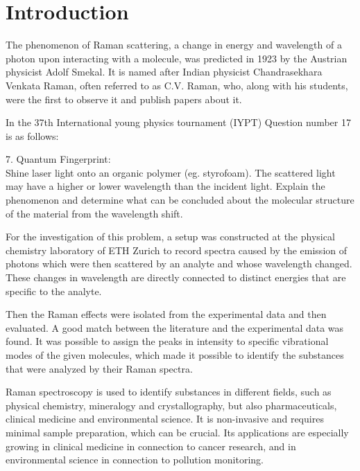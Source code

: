 \section{Introduction}


The phenomenon of Raman scattering, a change in energy and wavelength of a photon upon interacting with a molecule, was predicted in 1923 by the Austrian physicist Adolf Smekal. It is named after  Indian physicist Chandrasekhara Venkata Raman, often referred to as C.V. Raman, who, along with his students, were the first to observe it and publish papers about it.
\bigskip

In the 37th International young physics tournament (IYPT) Question number 17 is as follows:

\bigskip

7. Quantum Fingerprint:\\
 Shine laser light onto an organic polymer (eg. styrofoam). The scattered light may have a higher or lower wavelength than the incident light. Explain the phenomenon and determine what can be concluded about the molecular structure of the material from the wavelength shift.\cite{iypt}

\bigskip

For the investigation of this problem, a setup was constructed at the physical chemistry laboratory of ETH Zurich to record spectra caused by the emission of photons which were then scattered by an analyte and whose wavelength changed. These changes in wavelength are directly connected to distinct energies that are specific to the analyte.

Then the Raman effects were isolated from the experimental data and then evaluated. A good match between the literature and the experimental data was found. It was possible to assign the peaks in intensity to specific vibrational modes of the given molecules, which made it possible to identify the substances that were analyzed by their Raman spectra.

\bigskip

Raman spectroscopy is used to identify substances in different fields, such as physical chemistry, mineralogy and crystallography, but also pharmaceuticals, clinical medicine and environmental science. It is non-invasive and requires minimal sample preparation, which can be crucial. Its applications are especially growing in clinical medicine in connection to cancer research, and in environmental science in connection to pollution monitoring.

\newpage